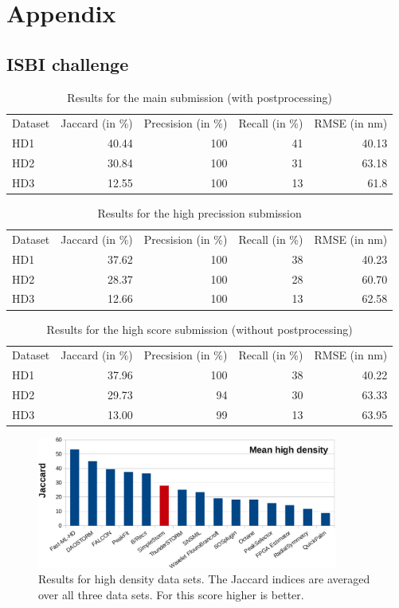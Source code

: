 \chapter{Appendix}
\section{ISBI challenge}
\begin{table}
\caption{Results for the main submission (with postprocessing)}
\begin{tabular}{lrrrr}
Dataset&Jaccard (in \%)&Precsision (in \%)& Recall (in \%) & RMSE (in nm)\\
HD1&40.44&100&41&40.13\\
HD2&30.84&100&31&63.18\\
HD3&12.55&100&13&61.8
\end{tabular} \label{reshd1}
\end{table}


\begin{table}
\caption{Results for the high precission submission}
\begin{tabular}{lrrrr}
Dataset&Jaccard (in \%)&Precsision (in \%)& Recall (in \%) & RMSE (in nm)\\
HD1&37.62&100&38&40.23\\
HD2&28.37&100&28&60.70\\
HD3&12.66&100&13&62.58
\end{tabular}\label{reshd2}
\end{table}
\begin{table}
\caption{Results for the high score submission (without postprocessing)}
\begin{tabular}{lrrrr}
Dataset&Jaccard (in \%)&Precsision (in \%)& Recall (in \%) & RMSE (in nm)\\
HD1&37.96&100&38&40.22\\
HD2&29.73&94&30&63.33\\
HD3&13.00&99&13&63.95
\end{tabular}\label{reshd3}
\end{table}

\begin{figure}
\centering
\includegraphics[width = 0.88\textwidth]{pictures/diagrammsChallenge/MeanHighDensityJaccardCropped.pdf}
	\caption{Results for high density data sets. The Jaccard indices are averaged over all three data sets. For this score higher is better.}
	\label{meanJaccardHighDensity}
\end{figure}

